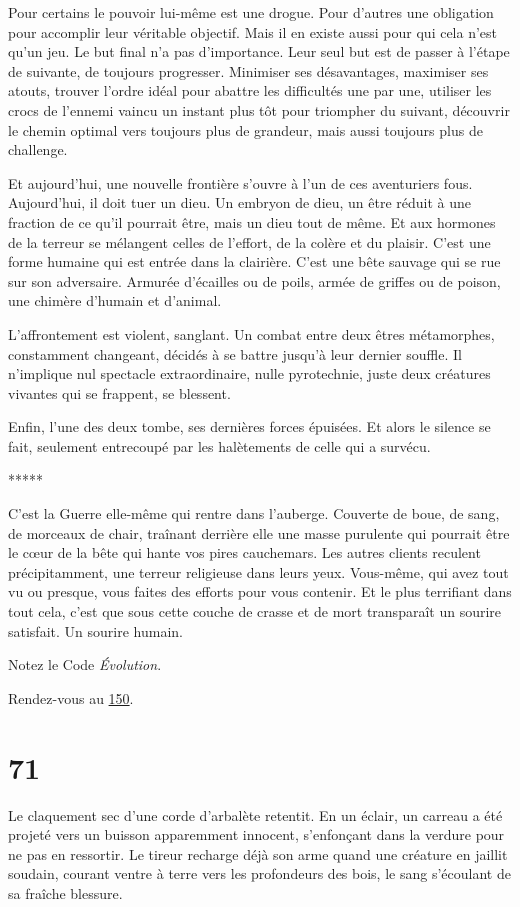 \documentclass{report}
\newcommand{\gsection}[1]{
    \section{#1}
    \label{section-#1}
}
\newcommand{\glink}[1]{\hyperref[section-#1]{#1}}
\newcommand{\ellipse}{
    \begin{center}
        *****
    \end{center}
}
\begin{document}
Pour certains le pouvoir lui-même est une drogue. Pour d'autres une obligation pour accomplir leur véritable objectif. Mais il en existe aussi pour qui cela n'est qu'un jeu. Le but final n'a pas d'importance. Leur seul but est de passer à l'étape de suivante, de toujours progresser. Minimiser ses désavantages, maximiser ses atouts, trouver l'ordre idéal pour abattre les difficultés une par une, utiliser les crocs de l'ennemi vaincu un instant plus tôt pour triompher du suivant, découvrir le chemin optimal vers toujours plus de grandeur, mais aussi toujours plus de challenge.

Et aujourd'hui, une nouvelle frontière s'ouvre à l'un de ces aventuriers fous. Aujourd'hui, il doit tuer un dieu. Un embryon de dieu, un être réduit à une fraction de ce qu'il pourrait être, mais un dieu tout de même. Et aux hormones de la terreur se mélangent celles de l'effort, de la colère et du plaisir.
C'est une forme humaine qui est entrée dans la clairière. C'est une bête sauvage qui se rue sur son adversaire. Armurée d'écailles ou de poils, armée de griffes ou de poison, une chimère d'humain et d'animal.

L'affrontement est violent, sanglant. Un combat entre deux êtres métamorphes, constamment changeant, décidés à se battre jusqu'à leur dernier souffle. Il n'implique nul spectacle extraordinaire, nulle pyrotechnie, juste deux créatures vivantes qui se frappent, se blessent.

Enfin, l'une des deux tombe, ses dernières forces épuisées. Et alors le silence se fait, seulement entrecoupé par les halètements de celle qui a survécu.

\ellipse

C'est la Guerre elle-même qui rentre dans l'auberge. Couverte de boue, de sang, de morceaux de chair, traînant derrière elle une masse purulente qui pourrait être le cœur de la bête qui hante vos pires cauchemars. Les autres clients reculent précipitamment, une terreur religieuse dans leurs yeux. Vous-même, qui avez tout vu ou presque, vous faites des efforts pour vous contenir. Et le plus terrifiant dans tout cela, c'est que sous cette couche de crasse et de mort transparaît un sourire satisfait. Un sourire humain.

Notez le Code \emph{Évolution}.

Rendez-vous au \glink{150}.

\gsection{71}

Le claquement sec d'une corde d'arbalète retentit. En un éclair, un carreau a été projeté vers un buisson apparemment innocent, s'enfonçant dans la verdure pour ne pas en ressortir. Le tireur recharge déjà son arme quand une créature en jaillit soudain, courant ventre à terre vers les profondeurs des bois, le sang s'écoulant de sa fraîche blessure.
\end{document}
